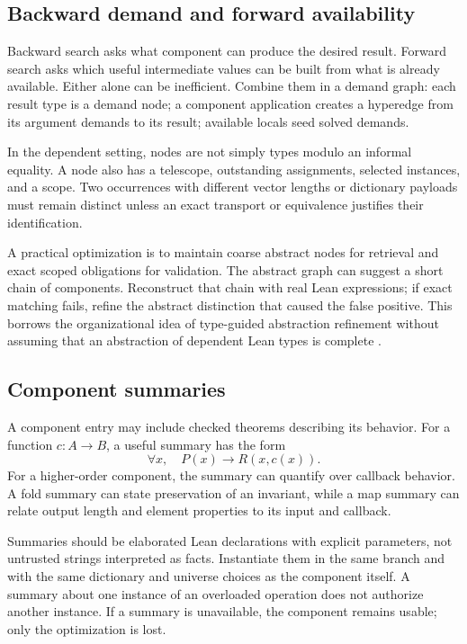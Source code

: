 \documentclass[11pt,letterpaper]{article}
\theoremstyle{definition}
\theoremstyle{remark}
\begin{document}
\subsection{Backward demand and forward availability}

Backward search asks what component can produce the desired result. Forward search asks which useful intermediate values can be built from what is already available. Either alone can be inefficient. Combine them in a demand graph: each result type is a demand node; a component application creates a hyperedge from its argument demands to its result; available locals seed solved demands.

In the dependent setting, nodes are not simply types modulo an informal equality. A node also has a telescope, outstanding assignments, selected instances, and a scope. Two occurrences with different vector lengths or dictionary payloads must remain distinct unless an exact transport or equivalence justifies their identification.

A practical optimization is to maintain coarse abstract nodes for retrieval and exact scoped obligations for validation. The abstract graph can suggest a short chain of components. Reconstruct that chain with real Lean expressions; if exact matching fails, refine the abstract distinction that caused the false positive. This borrows the organizational idea of type-guided abstraction refinement without assuming that an abstraction of dependent Lean types is complete \cite{tygar}.

\subsection{Component summaries}

A component entry may include checked theorems describing its behavior. For a function $c:A\to B$, a useful summary has the form
\[
 \forall x,\quad P(x)\to R(x,c(x)).
\]
For a higher-order component, the summary can quantify over callback behavior. A fold summary can state preservation of an invariant, while a map summary can relate output length and element properties to its input and callback.

Summaries should be elaborated Lean declarations with explicit parameters, not untrusted strings interpreted as facts. Instantiate them in the same branch and with the same dictionary and universe choices as the component itself. A summary about one instance of an overloaded operation does not authorize another instance. If a summary is unavailable, the component remains usable; only the optimization is lost.
\end{document}
